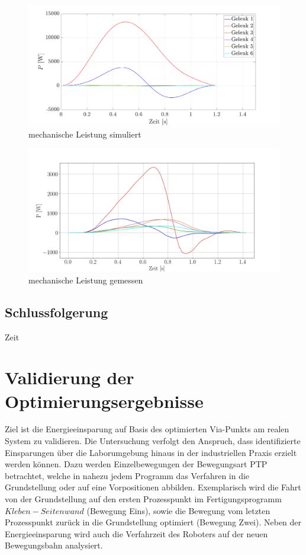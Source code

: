 \begin{figure}[tbph]
	\centering
	\includegraphics[width=1\linewidth]{images/pmat}
	\caption{mechanische Leistung simuliert}
	\label{fig:pmat}
\end{figure}
\begin{figure}[tbph]
	\centering
	\includegraphics[width=1\linewidth]{images/p}
	\caption{mechanische Leistung gemessen}
	\label{fig:p}
\end{figure}






\subsection{Schlussfolgerung}



Zeit


\section{Validierung der Optimierungsergebnisse}
Ziel ist die Energieeinsparung auf Basis des optimierten Via-Punkts am realen System zu validieren. Die Untersuchung verfolgt den Anspruch, dass identifizierte Einsparungen über die Laborumgebung hinaus in der industriellen Praxis erzielt werden können. Dazu werden  Einzelbewegungen der Bewegungsart PTP betrachtet, welche in nahezu jedem Programm das Verfahren in die Grundstellung oder auf eine Vorpositionen abbilden. Exemplarisch wird die Fahrt von der Grundstellung auf den ersten Prozesspunkt im Fertigungsprogramm $Kleben-Seitenwand$ (Bewegung Eins), sowie die Bewegung vom letzten Prozesspunkt zurück in die Grundstellung optimiert (Bewegung Zwei). Neben der Energieeinsparung wird auch die Verfahrzeit des Roboters auf der neuen Bewegungsbahn analysiert.
%
